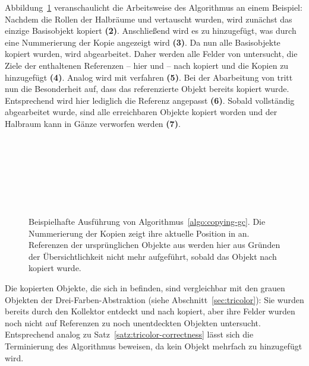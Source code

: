 Abbildung~\ref{fig:fenichel-example} veranschaulicht die Arbeitsweise des Algorithmus an einem Beispiel:
Nachdem die Rollen der Halbräume  und  vertauscht wurden, wird zunächst das einzige Basisobjekt  kopiert \textbf{(2)}.
Anschließend wird es zu  hinzugefügt, was durch eine Nummerierung der Kopie  angezeigt wird \textbf{(3)}.
Da nun alle Basisobjekte kopiert wurden, wird  abgearbeitet.
Daher werden alle Felder von  untersucht, die Ziele der enthaltenen Referenzen -- hier  und  -- nach  kopiert und die Kopien zu  hinzugefügt \textbf{(4)}.
Analog wird mit  verfahren \textbf{(5)}.
Bei der Abarbeitung von  tritt nun die Besonderheit auf, dass das referenzierte Objekt  bereits kopiert wurde.
Entsprechend wird hier lediglich die Referenz angepasst \textbf{(6)}.
Sobald  vollständig abgearbeitet wurde, sind alle erreichbaren Objekte kopiert worden und der Halbraum  kann in Gänze verworfen werden \textbf{(7)}.

\newpage

\begin{figure}[h!]
	\centering
	\\[0.5cm]
	\\[0.5cm]
	\\[0.5cm]
	\\[0.5cm]
	\\[0.5cm]
	\\[0.5cm]
	
	\caption[Ausführung der kopierenden Garbage Collection]{Beispielhafte Ausführung von Algorithmus~\ref{algo:copying-gc}. Die Nummerierung der Kopien zeigt ihre aktuelle Position in  an. Referenzen der ursprünglichen Objekte aus  werden hier aus Gründen der Übersichtlichkeit nicht mehr aufgeführt, sobald das Objekt nach  kopiert wurde.}
	\label{fig:fenichel-example}
\end{figure}

Die kopierten Objekte, die sich in  befinden, sind vergleichbar mit den grauen Objekten der Drei-Farben-Abstraktion (siehe Abschnitt~\ref{sec:tricolor}):
Sie wurden bereits durch den Kollektor entdeckt und nach  kopiert, aber ihre Felder wurden noch nicht auf Referenzen zu noch unentdeckten Objekten untersucht.
Entsprechend analog zu Satz~\ref{satz:tricolor-correctness} lässt sich die Terminierung des Algorithmus beweisen, da kein Objekt mehrfach zu  hinzugefügt wird.

